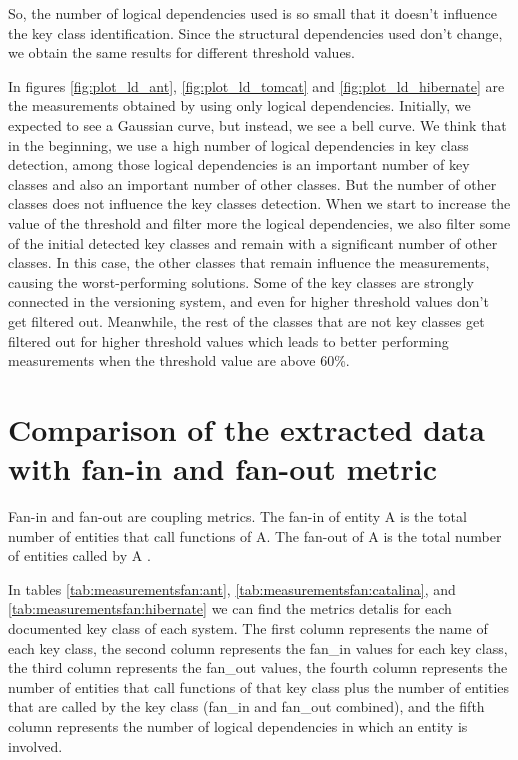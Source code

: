\documentclass[12pt]{mitthesis}
\begin{document}
 So, the number of logical dependencies used is so small that it doesn't influence the key class identification. Since the structural dependencies used don't change, we obtain the same results for different threshold values. 



In figures \ref{fig:plot_ld_ant}, \ref{fig:plot_ld_tomcat} and \ref{fig:plot_ld_hibernate} are the measurements obtained by using only logical dependencies.
Initially, we expected to see a Gaussian curve, but instead, we see a bell curve.  We think that in the beginning, we use a high number of logical dependencies in key class detection, among those logical dependencies is an important number of key classes and also an important number of other classes. But the number of other classes does not influence the key classes detection. When we start to increase the value of the threshold and filter more the logical dependencies, we also filter some of the initial detected key classes and remain with a significant number of other classes. In this case, the other classes that remain influence the measurements, causing the worst-performing solutions. 
Some of the key classes are strongly connected in the versioning system, and even for higher threshold values don't get filtered out. Meanwhile, the rest of the classes that are not key classes get filtered out for higher threshold values which leads to better performing measurements when the threshold value are above 60\%. 



\section{Comparison of the extracted data with fan-in and fan-out metric}
\label{sec:metrics}

Fan-in and fan-out are coupling metrics. The fan-in of entity A is the total number of entities that call functions of A. The fan-out of A is the total number of entities called by A \cite{5507329}.


In tables \ref{tab:measurementsfan:ant}, \ref{tab:measurementsfan:catalina}, and \ref{tab:measurementsfan:hibernate} we can find the metrics detalis for each documented key class of each system.
The first column represents the name of each key class, the second column represents the fan\_in values for each key class, the third column represents the fan\_out values, the fourth column represents the number of entities that call functions of that key class plus the number of entities that are called by the key class (fan\_in and fan\_out combined), and the fifth column represents the number of logical dependencies in which an entity is involved. 
\end{document}
